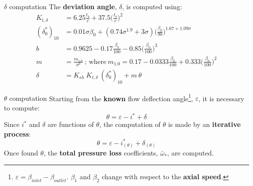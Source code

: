 	\begin{frame}{$\delta$ computation}
		The \textbf{deviation angle}, $\delta$, is computed using:
		\begin{align}
			K_{t,\delta} & = 6.25 \frac{t_b}{c} + 37.5 \Bigg(\frac{t_b}{c}\Bigg)^2 \nonumber \\ 
			(\delta^*_0)_{10} & = 0.01 \sigma \beta_0 + (0.74 \sigma^{1.9} + 3 \sigma) \Bigg(\frac{\beta_0}{90}\Bigg)^{1.67 + 1.09 \sigma} \nonumber \\
			b & = 0.9625 - 0.17 \frac{\beta_0}{100} - 0.85 \Bigg(\frac{\beta_0}{100}\Bigg)^3 \nonumber \\ 
			m & = \frac{m_{1.0}}{\sigma^b} \ \text{; where} \ m_{1.0} = 0.17 - 0.0333 \frac{\beta_0}{100} + 0.333 \Bigg(\frac{\beta_0}{100}\Bigg)^2 \nonumber \\
			\delta & = K_{sh} \ K_{t,\delta} \ (\delta^*_0)_{10} + m \ \theta \nonumber  
		\end{align}
	\end{frame}

	\begin{frame}{$\theta$ computation}
		Starting from the \textbf{known} flow deflection angle\footnote{$\varepsilon = \beta_{inlet} - \beta_{outlet}$. $\beta_1$ and $\beta_2$ change with respect to the \textbf{axial speed}.}, $\varepsilon$, it is necessary to compute:
		\begin{equation}
			\theta = \varepsilon - i^* + \delta \nonumber
		\end{equation}
		Since $i^*$ and $\delta$ are functions of $\theta$, the computation of $\theta$ is made by an \textbf{iterative process}:
		\begin{equation}
			\theta = \varepsilon - i^*_{(\theta)} + \delta_{(\theta)} \nonumber
		\end{equation}
		Once found $\theta$, the \textbf{total pressure loss} coefficients, $\bar{\omega}_{*}$, are computed.   
	\end{frame}

